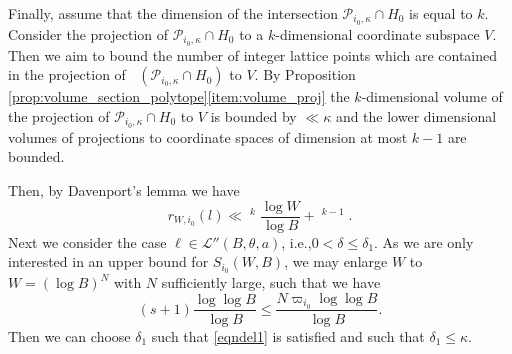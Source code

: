 \documentclass[11pt]{article}
\newcommand{\ie}{i.e.,\xspace}
\numberwithin{equation}{section}
\DeclareMathOperator{\LBt}{\mathit{L(B,\theta)}}
\newcommand{\cLBta}{\calL''(B,\theta,a)}
\let\del\delta
\newcommand{\calL}{\mathcal{L}}
\theoremstyle{definition}
\numberwithin{theorem}{section}
\begin{document}
Finally, assume that the dimension of the intersection $\mathcal{P}_{i_0,\kappa}\cap H_0$ is equal to $k$. Consider the projection of $\mathcal{P}_{i_0,\kappa}\cap H_0$ to a $k$-dimensional coordinate subspace $V$. Then we aim to bound the number of integer lattice points which are contained in the projection of $\LBt(\mathcal{P}_{i_0,\kappa}\cap H_0)$ to $V$. By Proposition \ref{prop:volume_section_polytope}\eqref{item:volume_proj} the $k$-dimensional volume of the projection of $\mathcal{P}_{i_0,\kappa}\cap H_0$ to $V$ is bounded by $\ll \kappa$ and the lower dimensional volumes of projections to coordinate spaces of dimension at most $k-1$ are bounded.

Then, by Davenport's lemma \cite{davenport} we have
\[
r_{W,i_0}(l)\ll \LBt^{k} \frac{\log W}{\log B} + \LBt^{k-1}.
\]
Next we consider the case $\ell\in\cLBta$, \ie $0<\del\leq \del_1$. As we are only interested in an upper bound for $S_{i_0}(W,B)$, we may enlarge $W$ to $W=(\log B)^N$ with $N$ sufficiently large, such that we have
\[
(s+1)\frac{\log\log B}{\log B} \leq \frac{ N \varpi_{i_0} \log \log B}{\log B}.
\]
Then we can choose $\del_1$ such that \eqref{eqndel1} is satisfied and such that $\del_1\leq \kappa$.
\end{document}

